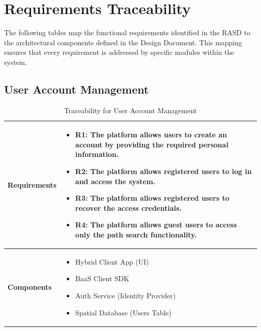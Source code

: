 \section{Requirements Traceability}

The following tables map the functional requirements identified in the RASD to the architectural components defined in the Design Document. This mapping ensures that every requirement is addressed by specific modules within the system.

\subsection{User Account Management}
\begin{table}[H]
    \centering
    \renewcommand{\arraystretch}{1.5}
    \begin{tabular}{|p{}|p{}|}
        \hline
        \textbf{Requirements} & 
        \begin{itemize}[nosep, leftmargin=*, label={}, before=\vspace{-0.6\baselineskip}, after=\strut]
            \item \textbf{R1:} The platform allows users to create an account by providing the required personal information.
            \item \textbf{R2:} The platform allows registered users to log in and access the system.
            \item \textbf{R3:} The platform allows registered users to recover the access credentials.
            \item \textbf{R4:} The platform allows guest users to access only the path search functionality.
        \end{itemize} \\
        \hline
        \textbf{Components} & 
        \begin{itemize}[nosep, leftmargin=*, before=\vspace{-0.6\baselineskip}, after=\strut]
            \item Hybrid Client App (UI)
            \item BaaS Client SDK
            \item Auth Service (Identity Provider)
            \item Spatial Database (Users Table)
        \end{itemize} \\
        \hline
    \end{tabular}
    \caption{Traceability for User Account Management}
\end{table}

